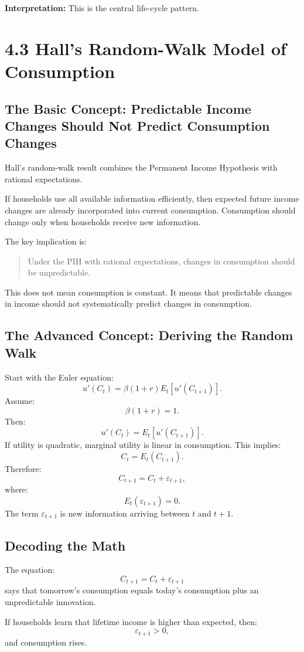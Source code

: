 \documentclass[12pt,a4paper]{article}
\begin{document}
\textbf{Interpretation:} This is the central life-cycle pattern.

\section*{4.3 Hall's Random-Walk Model of Consumption}
\subsection*{The Basic Concept: Predictable Income Changes Should Not Predict Consumption Changes}
Hall's random-walk result combines the Permanent Income Hypothesis with rational expectations.

If households use all available information efficiently, then expected future income changes are already incorporated into current consumption. Consumption should change only when households receive new information.

The key implication is:
\begin{quote}
Under the PIH with rational expectations, changes in consumption should be unpredictable.
\end{quote}

This does not mean consumption is constant. It means that predictable changes in income should not systematically predict changes in consumption.

\subsection*{The Advanced Concept: Deriving the Random Walk}
Start with the Euler equation:
\[ u'(C_t) = \beta(1+r)E_t[u'(C_{t+1})]. \]
Assume:
\[ \beta(1+r) = 1. \]
Then:
\[ u'(C_t) = E_t[u'(C_{t+1})]. \]
If utility is quadratic, marginal utility is linear in consumption. This implies:
\[ C_t = E_t(C_{t+1}). \]
Therefore:
\[ C_{t+1} = C_t + \varepsilon_{t+1}, \]
where:
\[ E_t(\varepsilon_{t+1}) = 0. \]
The term $\varepsilon_{t+1}$ is new information arriving between $t$ and $t+1$.

\subsection*{Decoding the Math}
The equation:
\[ C_{t+1} = C_t + \varepsilon_{t+1} \]
says that tomorrow's consumption equals today's consumption plus an unpredictable innovation.

If households learn that lifetime income is higher than expected, then:
\[ \varepsilon_{t+1} > 0, \]
and consumption rises.
\end{document}
